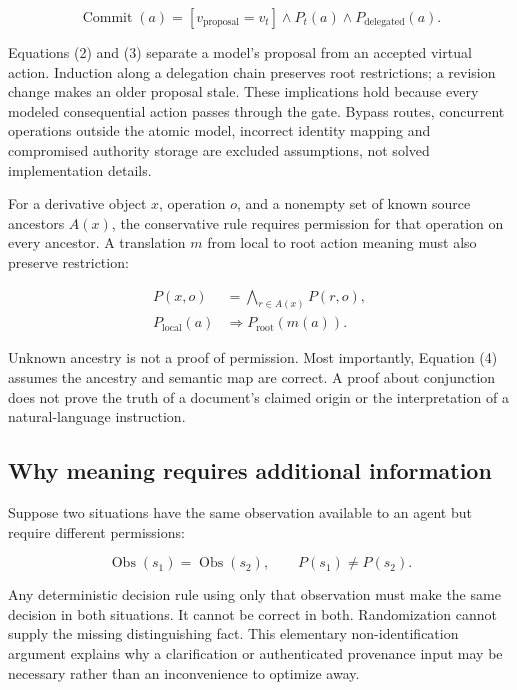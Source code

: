 \documentclass[11pt,letterpaper]{article}
\begin{document}
\begin{equation}
\operatorname{Commit}(a)=
[v_{\mathrm{proposal}}=v_t]\land P_t(a)\land P_{\mathrm{delegated}}(a). \tag{3}
\end{equation}

Equations (2) and (3) separate a model's proposal from an accepted virtual action. Induction along a delegation chain preserves root restrictions; a revision change makes an older proposal stale. These implications hold because every modeled consequential action passes through the gate. Bypass routes, concurrent operations outside the atomic model, incorrect identity mapping and compromised authority storage are excluded assumptions, not solved implementation details.

For a derivative object \(x\), operation \(o\), and a nonempty set of known source ancestors \(A(x)\), the conservative rule requires permission for that operation on every ancestor. A translation \(m\) from local to root action meaning must also preserve restriction:

\begin{equation}
\begin{aligned}
P(x,o)&=\bigwedge_{r\in A(x)}P(r,o),\\
P_{\mathrm{local}}(a)&\Longrightarrow P_{\mathrm{root}}(m(a)).
\end{aligned} \tag{4}
\end{equation}

Unknown ancestry is not a proof of permission. Most importantly, Equation (4) assumes the ancestry and semantic map are correct. A proof about conjunction does not prove the truth of a document's claimed origin or the interpretation of a natural-language instruction.

\subsection{Why meaning requires additional information}

Suppose two situations have the same observation available to an agent but require different permissions:

\begin{equation}
\operatorname{Obs}(s_1)=\operatorname{Obs}(s_2),\qquad P(s_1)\ne P(s_2). \tag{5}
\end{equation}

Any deterministic decision rule using only that observation must make the same decision in both situations. It cannot be correct in both. Randomization cannot supply the missing distinguishing fact. This elementary non-identification argument explains why a clarification or authenticated provenance input may be necessary rather than an inconvenience to optimize away.
\end{document}
